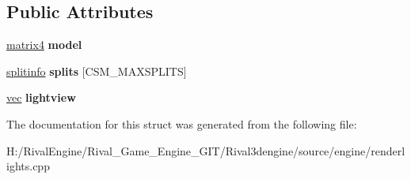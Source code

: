 \subsection*{Public Attributes}
\begin{DoxyCompactItemize}
\item 
\mbox{\label{structcascadedshadowmap_ac4bacc0a186dd063bf7a4a9a16c06b02}} 
\hyperlink{structmatrix4}{matrix4} {\bfseries model}
\item 
\mbox{\label{structcascadedshadowmap_a123a1f431c3e2672840900f32ee668ab}} 
\hyperlink{structcascadedshadowmap_1_1splitinfo}{splitinfo} {\bfseries splits} \mbox{[}C\+S\+M\+\_\+\+M\+A\+X\+S\+P\+L\+I\+TS\mbox{]}
\item 
\mbox{\label{structcascadedshadowmap_a875fc5eb6743632e69b6b4502d56319c}} 
\hyperlink{structvec}{vec} {\bfseries lightview}
\end{DoxyCompactItemize}


The documentation for this struct was generated from the following file\+:\begin{DoxyCompactItemize}
\item 
H\+:/\+Rival\+Engine/\+Rival\+\_\+\+Game\+\_\+\+Engine\+\_\+\+G\+I\+T/\+Rival3dengine/source/engine/renderlights.\+cpp\end{DoxyCompactItemize}
